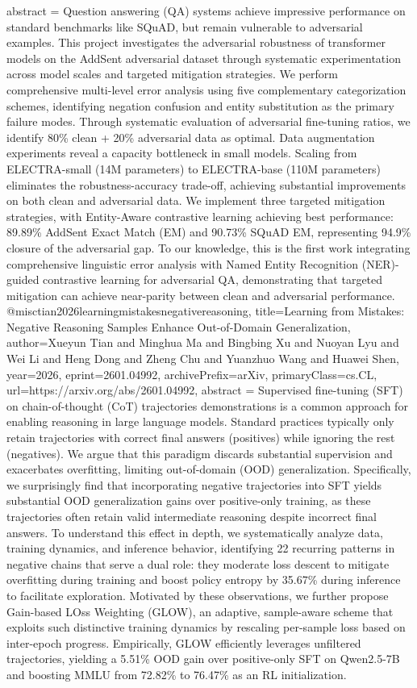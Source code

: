 {      abstract = {Question answering (QA) systems achieve impressive performance on standard benchmarks like SQuAD, but remain vulnerable to adversarial examples. This project investigates the adversarial robustness of transformer models on the AddSent adversarial dataset through systematic experimentation across model scales and targeted mitigation strategies. We perform comprehensive multi-level error analysis using five complementary categorization schemes, identifying negation confusion and entity substitution as the primary failure modes. Through systematic evaluation of adversarial fine-tuning ratios, we identify 80\% clean + 20\% adversarial data as optimal. Data augmentation experiments reveal a capacity bottleneck in small models. Scaling from ELECTRA-small (14M parameters) to ELECTRA-base (110M parameters) eliminates the robustness-accuracy trade-off, achieving substantial improvements on both clean and adversarial data. We implement three targeted mitigation strategies, with Entity-Aware contrastive learning achieving best performance: 89.89\% AddSent Exact Match (EM) and 90.73\% SQuAD EM, representing 94.9\% closure of the adversarial gap. To our knowledge, this is the first work integrating comprehensive linguistic error analysis with Named Entity Recognition (NER)-guided contrastive learning for adversarial QA, demonstrating that targeted mitigation can achieve near-parity between clean and adversarial performance.}
}@misc{tian2026learningmistakesnegativereasoning,
      title={Learning from Mistakes: Negative Reasoning Samples Enhance Out-of-Domain Generalization}, 
      author={Xueyun Tian and Minghua Ma and Bingbing Xu and Nuoyan Lyu and Wei Li and Heng Dong and Zheng Chu and Yuanzhuo Wang and Huawei Shen},
      year={2026},
      eprint={2601.04992},
      archivePrefix={arXiv},
      primaryClass={cs.CL},
      url={https://arxiv.org/abs/2601.04992},
      abstract = {Supervised fine-tuning (SFT) on chain-of-thought (CoT) trajectories demonstrations is a common approach for enabling reasoning in large language models. Standard practices typically only retain trajectories with correct final answers (positives) while ignoring the rest (negatives). We argue that this paradigm discards substantial supervision and exacerbates overfitting, limiting out-of-domain (OOD) generalization. Specifically, we surprisingly find that incorporating negative trajectories into SFT yields substantial OOD generalization gains over positive-only training, as these trajectories often retain valid intermediate reasoning despite incorrect final answers. To understand this effect in depth, we systematically analyze data, training dynamics, and inference behavior, identifying 22 recurring patterns in negative chains that serve a dual role: they moderate loss descent to mitigate overfitting during training and boost policy entropy by 35.67\% during inference to facilitate exploration. Motivated by these observations, we further propose Gain-based LOss Weighting (GLOW), an adaptive, sample-aware scheme that exploits such distinctive training dynamics by rescaling per-sample loss based on inter-epoch progress. Empirically, GLOW efficiently leverages unfiltered trajectories, yielding a 5.51\% OOD gain over positive-only SFT on Qwen2.5-7B and boosting MMLU from 72.82\% to 76.47\% as an RL initialization.}
}
